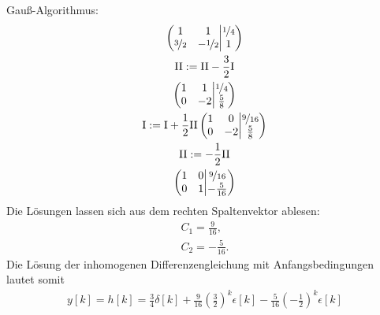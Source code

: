 \documentclass[11pt,a4paper,DIV=12]{scrartcl}
\begin{document}
%
%
Gauß-Algorithmus:
%
%
\begin{gather}
	\left\lparen
	\begin{matrix}
		1 & 1 \\
		\nicefrac{3}{2} & -\nicefrac{1}{2}
	\end{matrix}
	\middle\vert
	\begin{matrix}
		\nicefrac{1}{4}\\
		1
	\end{matrix}
	\right\rparen\\
	\mathrm{II}:=\mathrm{II}-\frac{3}{2}\mathrm{I}\\
	\left\lparen
	\begin{matrix}
		1 & 1 \\
		0 & -2
	\end{matrix}
	\middle\vert
	\begin{matrix}
		\nicefrac{1}{4}\\
		\frac{5}{8}
	\end{matrix}
	\right\rparen\\
	\mathrm{I}:=\mathrm{I}+\frac{1}{2}\mathrm{II}
	\left\lparen
	\begin{matrix}
		1 & 0 \\
		0 & -2
	\end{matrix}
	\middle\vert
	\begin{matrix}
		\nicefrac{9}{16}\\
		\frac{5}{8}
	\end{matrix}
	\right\rparen\\
	\mathrm{II}:=-\frac{1}{2}\mathrm{II}\\
	\left\lparen
	\begin{matrix}
		1 & 0 \\
		0 & 1
	\end{matrix}
	\middle\vert
	\begin{matrix}
		\nicefrac{9}{16}\\
		-\frac{5}{16}
	\end{matrix}
	\right\rparen
\end{gather}
%
%
%
Die Lösungen lassen sich aus dem rechten Spaltenvektor ablesen:
%
\begin{gather}
	C_1=\frac{9}{16},\nonumber \\
	C_2=-\frac{5}{16}.\nonumber
\end{gather}
%
Die Lösung der inhomogenen Differenzengleichung mit Anfangsbedingungen lautet 
somit
%
%
\begin{gather}
	y[k]=h[k]=
	\frac{3}{4}\delta[k]+\frac{9}{16}\left(\frac{3}{2}\right)^k\epsilon[k]
	-\frac{5}{16}\left(-\frac{1}{2}\right)^k\epsilon[k]
\end{gather}
%
%
\newpage
\end{document}
